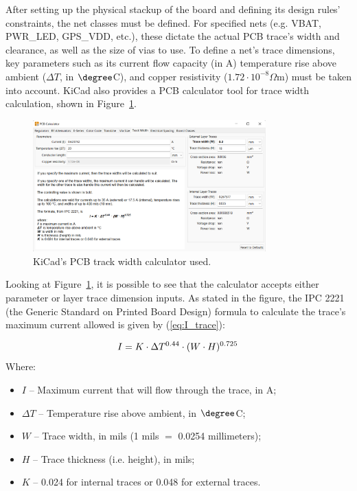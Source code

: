 After setting up the physical stackup of the board and defining its design rules' constraints, the net classes must be defined. For specified nets (e.g. VBAT, PWR\_LED, GPS\_VDD, etc.), these dictate the actual PCB trace's width and clearance, as well as the size of vias to use. To define a net's trace dimensions, key parameters such as its current flow capacity (in A) temperature rise above ambient ($\Delta T$, in $\degree$C), and copper resistivity ($1.72 \cdot 10^{-8} \Omega$m) must be taken into account. KiCad also provides a PCB calculator tool for trace width calculation, shown in Figure~\ref{fig:PCB_calculator}.

\begin{figure}[h]
	\centering
	\includegraphics[width=0.8\textwidth]{Chapters/Figures/chapter5/PCB_calculator.png}
	\caption{KiCad's PCB track width calculator used.}
	\label{fig:PCB_calculator}
\end{figure}

Looking at Figure~\ref{fig:PCB_calculator}, it is possible to see that the calculator accepts either parameter or layer trace dimension inputs. As stated in the figure, the IPC 2221 (the Generic Standard on Printed Board Design) formula to calculate the trace's maximum current allowed is given by (\ref{eq:I_trace}):

\begin{equation}\label{eq:I_trace}
	I = K \cdot \Delta T^{0.44} \cdot (W \cdot H)^{0.725}\,\medskip
\end{equation}
\noindent Where:
\begin{itemize}
	\item $I$ -- Maximum current that will flow through the trace, in A;
	
	\item $\Delta T$ -- Temperature rise above ambient, in $\degree$C;
	
	\item $W$ -- Trace width, in mils (1 mils $=$ 0.0254 millimeters);
	
	\item $H$ -- Trace thickness (i.e. height), in mils;
	
	\item $K$ -- 0.024 for internal traces or 0.048 for external traces.
\end{itemize}

